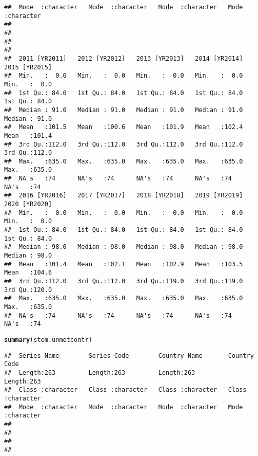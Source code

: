 \documentclass{article}\usepackage[]{graphicx}\usepackage[]{xcolor}
\makeatletter
\newcommand{\hldef}[1]{\textcolor[rgb]{0.345,0.345,0.345}{#1}}%
\newcommand{\hlkwd}[1]{\textcolor[rgb]{0.737,0.353,0.396}{\textbf{#1}}}%
\newenvironment{kframe}{%
 \def\at@end@of@kframe{}%
 \ifinner\ifhmode%
  \def\at@end@of@kframe{\end{minipage}}%
  \begin{minipage}{\columnwidth}%
 \fi\fi%
 \def\FrameCommand##1{\hskip\@totalleftmargin \hskip-\fboxsep
 \colorbox{shadecolor}{##1}\hskip-\fboxsep
     \hskip-\linewidth \hskip-\@totalleftmargin \hskip\columnwidth}%
 \MakeFramed {\advance\hsize-\width
   \@totalleftmargin\z@ \linewidth\hsize
   \@setminipage}}%
 {\par\unskip\endMakeFramed%
 \at@end@of@kframe}
\newenvironment{knitrout}{}{} %
\makeatother
\begin{document}
\begin{knitrout}
\begin{kframe}
\begin{verbatim}
##  Mode  :character   Mode  :character   Mode  :character   Mode  :character  
##                                                                             
##                                                                             
##                                                                             
##                                                                             
##  2011 [YR2011]   2012 [YR2012]   2013 [YR2013]   2014 [YR2014]   2015 [YR2015]  
##  Min.   :  0.0   Min.   :  0.0   Min.   :  0.0   Min.   :  0.0   Min.   :  0.0  
##  1st Qu.: 84.0   1st Qu.: 84.0   1st Qu.: 84.0   1st Qu.: 84.0   1st Qu.: 84.0  
##  Median : 91.0   Median : 91.0   Median : 91.0   Median : 91.0   Median : 91.0  
##  Mean   :101.5   Mean   :100.6   Mean   :101.9   Mean   :102.4   Mean   :101.4  
##  3rd Qu.:112.0   3rd Qu.:112.0   3rd Qu.:112.0   3rd Qu.:112.0   3rd Qu.:112.0  
##  Max.   :635.0   Max.   :635.0   Max.   :635.0   Max.   :635.0   Max.   :635.0  
##  NA's   :74      NA's   :74      NA's   :74      NA's   :74      NA's   :74     
##  2016 [YR2016]   2017 [YR2017]   2018 [YR2018]   2019 [YR2019]   2020 [YR2020]  
##  Min.   :  0.0   Min.   :  0.0   Min.   :  0.0   Min.   :  0.0   Min.   :  0.0  
##  1st Qu.: 84.0   1st Qu.: 84.0   1st Qu.: 84.0   1st Qu.: 84.0   1st Qu.: 84.0  
##  Median : 98.0   Median : 98.0   Median : 98.0   Median : 98.0   Median : 98.0  
##  Mean   :101.4   Mean   :102.1   Mean   :102.9   Mean   :103.5   Mean   :104.6  
##  3rd Qu.:112.0   3rd Qu.:112.0   3rd Qu.:119.0   3rd Qu.:119.0   3rd Qu.:120.0  
##  Max.   :635.0   Max.   :635.0   Max.   :635.0   Max.   :635.0   Max.   :635.0  
##  NA's   :74      NA's   :74      NA's   :74      NA's   :74      NA's   :74
\end{verbatim}
\begin{alltt}
  \hlkwd{summary}\hldef{(stem.unmetcontr)}
\end{alltt}
\begin{verbatim}
##  Series Name        Series Code        Country Name       Country Code      
##  Length:263         Length:263         Length:263         Length:263        
##  Class :character   Class :character   Class :character   Class :character  
##  Mode  :character   Mode  :character   Mode  :character   Mode  :character  
##                                                                             
##                                                                             
##                                                                             
##                                                                             

\end{verbatim}
\end{kframe}
\end{knitrout}
\end{document}
